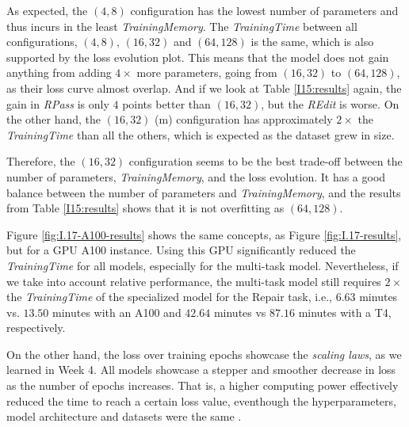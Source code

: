 \documentclass{article}
\begin{document}
As expected, the $(4, 8)$ configuration has the lowest number of parameters and thus incurs in the least \emph{TrainingMemory}. The \emph{TrainingTime} between all configurations, $(4, 8)$, $(16, 32)$ and $(64, 128)$ is the same, which is also supported by the loss evolution plot. This means that the model does not gain anything from adding $4\times$ more parameters, going from $(16, 32)$ to $(64, 128)$, as their loss curve almost overlap. And if we look at Table \ref{I15:results} again, the gain in \emph{RPass} is only $4$ points better than $(16, 32)$, but the \emph{REdit} is worse. On the other hand, the $(16, 32)$ (m) configuration has approximately $2\times$ the \emph{TrainingTime} than all the others, which is expected as the dataset grew in size.

Therefore, the $(16, 32)$ configuration seems to be the best trade-off between the number of parameters, \emph{TrainingMemory}, and the loss evolution. It has a good balance between the number of parameters and \emph{TrainingMemory}, and the results from Table \ref{I15:results} shows that it is not overfitting as $(64, 128)$.

Figure \ref{fig:I.17-A100-results} shows the same concepts, as Figure \ref{fig:I.17-results}, but for a GPU A100 instance. Using this GPU significantly reduced the \emph{TrainingTime} for all models, especially for the multi-task model. Nevertheless, if we take into account relative performance, the multi-task model still requires $2\times$ the \emph{TrainingTime} of the specialized model for the Repair task, i.e., $6.63$ minutes vs. $13.50$ minutes with an A100 and $42.64$ minutes vs $87.16$ minutes with a T4, respectively.

On the other hand, the loss over training epochs showcase the \emph{scaling laws}, as we learned in Week 4. All models showcase a stepper and smoother decrease in loss as the number of epochs increases. That is, a higher computing power effectively reduced the time to reach a certain loss value, eventhough the hyperparameters, model architecture and datasets were the same \cite{scalinglaws2020}.
\end{document}
